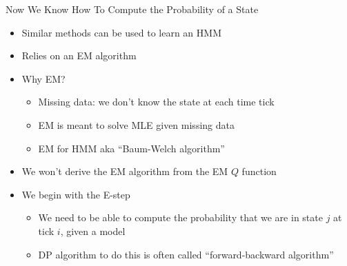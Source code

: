 \documentclass[aspectratio=169]{beamer}
\begin{document}
\begin{frame}{Now We Know How To Compute the Probability of a State}

\begin{itemize}
\item Similar methods can be used to learn an HMM
\item Relies on an EM algorithm
\item Why EM?
\begin{itemize}
\item Missing data: we don't know the state at each time tick
\item EM is meant to solve MLE given missing data
\item EM for HMM aka ``Baum-Welch algorithm''
\end{itemize}
\item We won't derive the EM algorithm from the EM $Q$ function
\item We begin with the E-step
\begin{itemize}
\item We need to be able to compute the probability that we are in state $j$ at tick $i$, given a model
\item DP algorithm to do this is often called ``forward-backward algorithm''
\end{itemize}
\end{itemize}
\end{frame}
\end{document}
